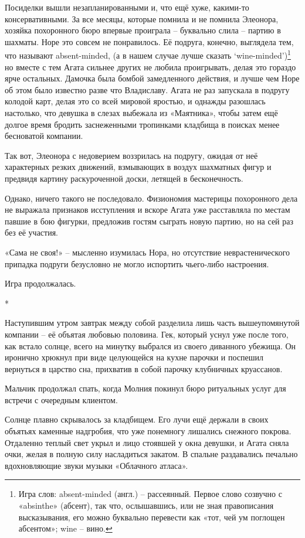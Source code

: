 \documentclass[
  a5paperpaper,
  DIV=11,
  numbers=noendperiod]{scrreprt}
\begin{document}
Посиделки вышли незапланированными и, что ещё хуже, какими-то
консервативными. За все месяцы, которые помнила и не помнила Элеонора,
хозяйка похоронного бюро впервые проиграла -- буквально слила -- партию
в шахматы. Норе это совсем не понравилось. Её подруга, конечно,
выглядела тем, что называют absent-minded, (а в нашем случае лучше
сказать `wine-minded')\footnote{Игра слов: absent-minded (англ.) --
  рассеянный. Первое слово созвучно с «absinthe» (абсент), так что,
  ослышавшись, или не зная правописания высказывания, его можно
  буквально перевести как «тот, чей ум поглощен абсентом»; wine -- вино.}
но вместе с тем Агата сильнее других не любила проигрывать, делая это
гораздо ярче остальных. Дамочка была бомбой замедленного действия, и
лучше чем Норе об этом было известно разве что Владиславу. Агата не раз
запускала в подругу колодой карт, делая это со всей мировой яростью, и
однажды разошлась настолько, что девушка в слезах выбежала из
«Маятника», чтобы затем ещё долгое время бродить заснеженными тропинками
кладбища в поисках менее бесноватой компании.

Так вот, Элеонора с недоверием воззрилась на подругу, ожидая от неё
характерных резких движений, взмывающих в воздух шахматных фигур и
предвидя картину раскуроченной доски, летящей в бесконечность.

Однако, ничего такого не последовало. Физиономия мастерицы похоронного
дела не выражала признаков исступления и вскоре Агата уже расставляла по
местам павшие в бою фигурки, предложив гостям сыграть новую партию, но
на сей раз без её участия.

«Сама не своя!» -- мысленно изумилась Нора, но отсутствие
неврастенического припадка подруги безусловно не могло испортить
чьего-либо настроения.

Игра продолжалась.

*

Наступившим утром завтрак между собой разделила лишь часть
вышеупомянутой компании -- её объятая любовью половина. Гек, который
уснул уже после того, как встало солнце, всего на минутку выбрался из
своего диванного убежища. Он иронично хрюкнул при виде целующейся на
кухне парочки и поспешил вернуться в царство сна, прихватив в собой
парочку клубничных круассанов.

Мальчик продолжал спать, когда Молния покинул бюро ритуальных услуг для
встречи с очередным клиентом.

Солнце плавно скрывалось за кладбищем. Его лучи ещё держали в своих
объятьях каменные надгробия, что уже понемногу лишались снежного
покрова. Отдаленно теплый свет укрыл и лицо стоявшей у окна девушки, и
Агата сняла очки, желая в полную силу насладиться закатом. В спальне
раздавались печально вдохновляющие звуки музыки «Облачного атласа».
\end{document}
